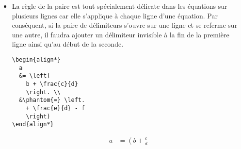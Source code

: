 \begin{itemize}
\begin{demo}
\begin{texample}
\begin{equation*}
\begin{aligned}
            1 - x, &\quad x < 1 \\
            x - 1, &\quad x \geq 1
          \end{aligned}
        \right.
      \end{equation*}
    \end{texample}
  \end{demo}
  (L'environnement  utilisé ci-dessus provient de
  .) On notera au passage que l'environnement 
  de  rend plus simple la réalisation de constructions
  comme celle ci-dessus.
  \begin{demo}
    \begin{texample}
\begin{lstlisting}
f(x) =
\begin{cases}
  1 - x, & x < 1 \\
  x - 1, & x \geq 1
\end{cases}
\end{lstlisting}
      \producing
      \begin{equation*}
        f(x) =
        \begin{cases}
          1 - x, & x < 1 \\
          x - 1, & x \geq 1
        \end{cases}
      \end{equation*}
    \end{texample}
  \end{demo}
%
\item La règle de la paire est tout spécialement délicate dans les
  équations sur plusieurs lignes car elle s'applique à chaque ligne
  d'une équation. Par conséquent, si la paire de délimiteurs s'ouvre
  sur une ligne et se referme sur une autre, il faudra ajouter un
  délimiteur invisible à la fin de la première ligne ainsi qu'au début
  de la seconde.
  \begin{demo}
    \begin{texample}
\begin{lstlisting}
\begin{align*}
  a
  &= \left(
    b + \frac{c}{d}
    \right. \\
  &\phantom{=} \left.
    + \frac{e}{d} - f
    \right)
\end{align*}
\end{lstlisting}
      \producing
      \begin{align*}
        a
        &= \left(
          b + \frac{c}{d}
          \right. \\
        &\phantom{=} \left.

\end{align*}
\end{texample}
\end{demo}
\end{itemize}

